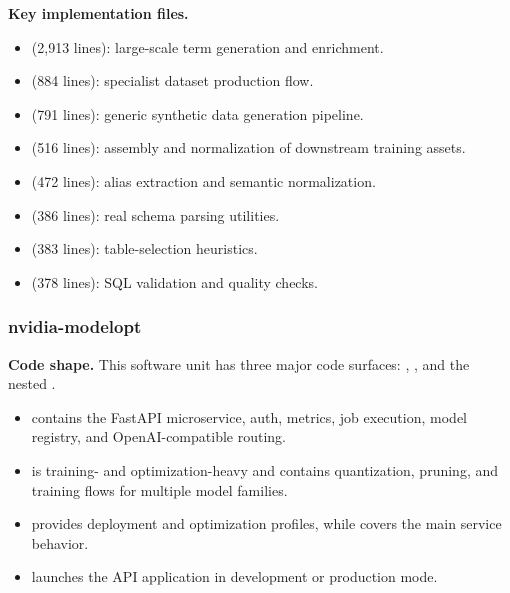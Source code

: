 \documentclass[11pt,a4paper]{article}
\begin{document}
\textbf{Key implementation files.}
\begin{itemize}[leftmargin=*]
    \item {} (2,913 lines): large-scale term generation and enrichment.
    \item {} (884 lines): specialist dataset production flow.
    \item {} (791 lines): generic synthetic data generation pipeline.
    \item {} (516 lines): assembly and normalization of downstream training assets.
    \item {} (472 lines): alias extraction and semantic normalization.
    \item {} (386 lines): real schema parsing utilities.
    \item {} (383 lines): table-selection heuristics.
    \item {} (378 lines): SQL validation and quality checks.
\end{itemize}

\subsubsection{nvidia-modelopt}

\textbf{Code shape.} This software unit has three major code surfaces: , , and the nested .
\begin{itemize}[leftmargin=*]
    \item {} contains the FastAPI microservice, auth, metrics, job execution, model registry, and OpenAI-compatible routing.
    \item {} is training- and optimization-heavy and contains quantization, pruning, and training flows for multiple model families.
    \item {} provides deployment and optimization profiles, while  covers the main service behavior.
    \item {} launches the API application in development or production mode.
\end{itemize}
\end{document}
